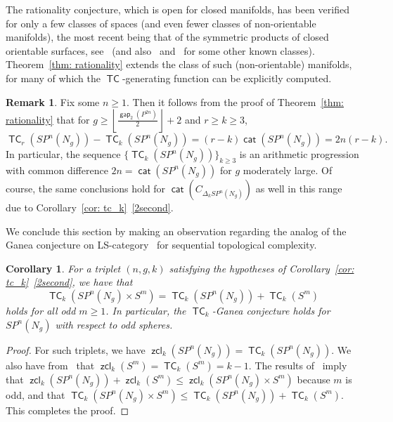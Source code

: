 \documentclass[amscd,amssymb,verbatim,10pt]{amsart}
\numberwithin{equation}{section}
\theoremstyle{plain}
\newtheorem{corollary}[thm]{Corollary}
\theoremstyle{definition}
\newtheorem{remark}[thm]{Remark}
\DeclareMathOperator{\cat}{{\mathsf{cat}}}
\DeclareMathOperator{\TC}{{\mathsf{TC}}}
\DeclareMathOperator{\zcl}{{\mathsf{zcl}}}
\DeclareMathOperator{\gap}{{\mathsf{gap}}}
\begin{document}
The rationality conjecture, which is open for closed manifolds, has been verified for only a few classes of spaces (and even fewer classes of non-orientable manifolds), the most recent being that of the symmetric products of closed orientable surfaces, see~\cite{Ja} (and also~\cite[Section~8]{FO} and~\cite{HL} for some other known classes). Theorem~\ref{thm: rationality} extends the class of such (non-orientable) manifolds, for many of which the $\TC$-generating function can be explicitly computed.

\begin{remark}
    Fix some $n\ge 1$. Then it follows from the proof of Theorem~\ref{thm: rationality} that for $g\ge\left\lfloor \tfrac{\gap_2(P^{2n})}{2}\right\rfloor+2$ and $r\ge k\ge 3$, 
   \[
   \TC_r(SP^n(N_g))-\TC_k(SP^n(N_g))=(r-k)\cat(SP^n(N_g))=2n(r-k).
   \]
   In particular, the sequence $\{\TC_{k}(SP^n(N_g))\}_{k\ge 3}$ is an arithmetic progression with common difference $2n=\cat(SP^n(N_g))$ for $g$ moderately large. Of course, the same conclusions hold for $\cat(C_{\Delta_{k}SP^n(N_g)})$ as well in this range due to Corollary~\ref{cor: tc_k}~\eqref{2second}.
\end{remark}

We conclude this section by making an observation regarding the analog of the Ganea conjecture on LS-category~\cite{CLOT} for sequential topological complexity.

\begin{corollary}
    For a triplet $(n,g,k)$ satisfying the hypotheses of Corollary~\ref{cor: tc_k}~\eqref{2second}, we have that
    \[
    \TC_k(SP^n(N_g)\times S^m)=\TC_k(SP^n(N_g))+ \TC_k(S^m)
    \]
    holds for all odd $m\ge 1$. In particular, the $\TC_k$-Ganea conjecture holds for $SP^n(N_g)$ with respect to odd spheres.
\end{corollary}
\begin{proof}
For such triplets, we have $\zcl_k(SP^n(N_g))=\TC_k(SP^n(N_g))$. We also have from~\cite{Ru} that $\zcl_k(S^m)=\TC_k(S^m)=k-1$. The results of~\cite{BGRT} imply that $\zcl_k(SP^n(N_g))+\zcl_k(S^m)\le\zcl_k(SP^n(N_g)\times S^m)$ because $m$ is odd, and that $\TC_k(SP^n(N_g)\times S^m)\le\TC_k(SP^n(N_g))+\TC_k(S^m)$. This completes the proof.
\end{proof}
\end{document}
